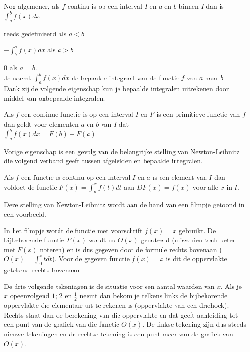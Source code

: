 \documentclass{article}
\begin{document}
\noindent Nog algemener, als $f$ continu is op een interval $I$ en $a$ en $b$ binnen $I$ dan is $\int ^b_a f(x)dx$

\hspace{1cm} reeds gedefinieerd als $a<b$

\hspace{1cm} $-\int^a_b f(x)dx$ als $a>b$

\hspace{1cm} 0 als $a=b$.\\

\noindent Je noemt $\int^b_a f(x)dx$ de bepaalde integraal van de functie $f$ van $a$ naar $b$.\\

\noindent Dank zij de volgende eigenschap kun je bepaalde integralen uitrekenen door middel van onbepaalde integralen.

\begin{eigenschap} Als $f$ een continue functie is op een interval $I$ en $F$ is een primitieve functie van $f$ dan geldt voor elementen $a$ en $b$ van $I$ dat\\
$\boxed { \int^b_a f(x)dx = F(b)-F(a) }$
\end{eigenschap}

\noindent Vorige eigenschap is een gevolg van de belangrijke stelling van Newton-Leibnitz die volgend verband geeft tussen afgeleiden en bepaalde integralen.

\begin{eigenschap}
Als $f$ een functie is continu op een interval $I$ en $a$ is een element van $I$ dan voldoet de functie $F(x) = \int^x_a f(t)dt$ aan $DF(x)=f(x)$ voor alle $x$ in $I$.
\end{eigenschap}

\noindent Deze stelling van Newton-Leibnitz wordt aan de hand van een filmpje getoond in een voorbeeld.

In het filmpje wordt de functie met voorschrift $f(x)=x$ gebruikt. De bijbehorende functie $F(x)$ wordt nu $O(x)$ genoteerd (misschien toch beter met $F(x)$ noteren) en is dus gegeven door de formule rechts bovenaan ($O(x)=\int ^x_0 tdt$).
Voor de gegeven functie $f(x)=x$ is dit de oppervlakte getekend rechts bovenaan.

De drie volgende tekeningen is de situatie voor een aantal waarden van $x$. Als je $x$ opeenvolgend $1$; $2$ en $\frac {1}{2}$ neemt dan bekom je telkens links de bijbehorende oppervlakte die elementair uit te rekenen is (oppervlakte van een driehoek). Rechts staat dan de berekening van die oppervlakte en dat geeft aanleiding tot een punt van de grafiek van die functie $O(x)$. De linkse tekening zijn dus steeds nieuwe tekeningen en de rechtse tekening is een punt meer van de grafiek van $O(x)$.
\end{document}
